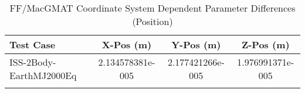 \begin{table}[htbp!]
\centering
\caption{ FF/MacGMAT Coordinate System Dependent Parameter Differences (Position)}
      \begin{tabular}{lccc}
      \hline\hline
          Test Case & X-Pos (m) & Y-Pos (m) & Z-Pos (m) \\
         \hline
         ISS-2Body-EarthMJ2000Eq & 2.134578381e-005 & 2.177421266e-005 & 1.976991371e-005 \\
      \hline\hline
      \label{Table: FF-MacGMAT CS Parameters Set 1} 
\end{tabular}
\end{table}
